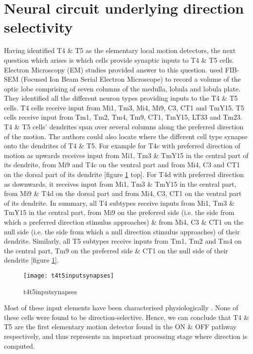 \section{Neural circuit underlying direction selectivity}
Having identified T4 \& T5 as the elementary local motion detectors, the next question which arises is which cells provide synaptic inputs to T4 \& T5 cells. Electron Microscopy (EM) studies \parencite{Shinomiya2019, Takemura2017} provided answer to this question. \cite{Shinomiya2019} used FIB-SEM (Focused Ion Beam Serial Electron Microscope) to record a volume of the optic lobe comprising of seven columns of the medulla, lobula and lobula plate. They identified all the different neuron types providing inputs to the T4 \& T5 cells. T4 cells receive input from Mi1, Tm3, Mi4, Mi9, C3, CT1 and TmY15. T5 cells receive input from Tm1, Tm2, Tm4, Tm9, CT1, TmY15, LT33 and Tm23. T4 \& T5 cells' dendrites span over several columns along the preferred direction of the motion. The authors could also locate where the different cell type synapse onto the dendrites of T4 \& T5. For example for T4c with preferred direction of motion as upwards receives input from Mi1, Tm3 \& TmY15 in the central part of its dendrite, from Mi9 and T4c on the ventral part and from Mi4, C3 and CT1 on the dorsal part of its dendrite [figure \ref{fig:t4t5inputsynapses} top]. For T4d with preferred direction as downwards, it receives input from Mi1, Tm3 \& TmY15 in the central part, from Mi9 \& T4d on the dorsal part and from Mi4, C3, CT1 on the ventral part of its dendrite. In summary, all T4 subtypes receive inputs from Mi1, Tm3 \& TmY15 in the central part, from Mi9 on the preferred side (i.e. the side from which a preferred direction stimulus approaches) \& from Mi4, C3 \& CT1 on the null side (i.e. the side from which a null direction stimulus approaches) of their dendrite. Similarly, all T5 subtypes receive inputs from Tm1, Tm2 and Tm4 on the central part, Tm9 on the preferred side \& CT1 on the null side of their dendrite [figure \ref{fig:t4t5inputsynapses}]. %

\begin{figure}[h]
\centering
\texttt{[image: t4t5inputsynapses]}
\caption{t4t5inputsynapses}
\label{fig:t4t5inputsynapses}
\end{figure}

Most of these input elements have been characterised physiologically \parencite{Arenz2017, Serbe2016, Strother2017, Meier2019, Borst2020}. None of these cells were found to be direction-selective. Hence, we can conclude that T4 \& T5 are the first elementary motion detector found in the ON \& OFF pathway respectively, and thus represents an important processing stage where direction is computed.    

